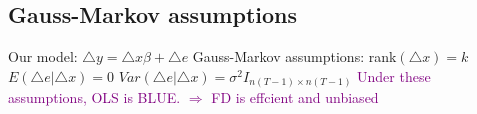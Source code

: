 \documentclass[a4paper,twoside,11pt]{article}
\begin{document}
\subsection{Gauss-Markov assumptions}
\begin{shaded*}
\noindent Our model: $\bigtriangleup y= \bigtriangleup x \beta + \bigtriangleup e$ 
\newline
\newline
Gauss-Markov assumptions: 
\newline
rank$(\bigtriangleup x ) = k$ 
\newline
$E(\bigtriangleup e| \bigtriangleup x) =0$ 
\newline
$Var(\bigtriangleup e | \bigtriangleup x) = \sigma^2 I_{n(T-1) \times n(T-1)}$ 
\newline
\textcolor{Purple}{Under these assumptions, OLS is BLUE. $\Rightarrow$ FD is effcient and unbiased}
\end{shaded*}
\end{document}
